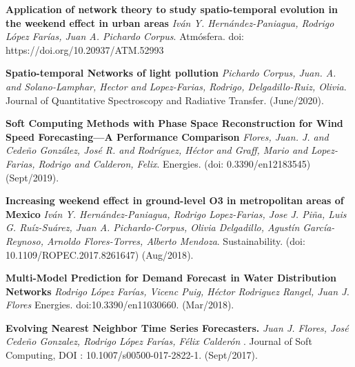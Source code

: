 \documentclass[10pt]{article}
\newenvironment{innerlist}[1][\enskip\textbullet]%
        {\begin{compactitem}[#1]}{\end{compactitem}}
\begin{document}
\begin{innerlist}
\item \textbf{Application of network theory to study spatio-temporal evolution in
the weekend effect in urban areas} \textit{Iván Y. Hernández-Paniagua, Rodrigo López Farías, Juan A. Pichardo Corpus}. Atmósfera. doi: https://doi.org/10.20937/ATM.52993

\item \textbf{Spatio-temporal Networks of light pollution} \textit{{Pichardo Corpus, Juan. A. and Solano-Lamphar, Hector and Lopez-Farias, Rodrigo, Delgadillo-Ruiz, Olivia}}. {Journal of Quantitative Spectroscopy and Radiative Transfer}. ({June/2020}).

\item \textbf{Soft Computing Methods with Phase Space Reconstruction for Wind Speed Forecasting—A Performance Comparison} \textit{{Flores, Juan. J. and Cedeño González, José R. and Rodríguez, Héctor and Graff, Mario and Lopez-Farias, Rodrigo and Calderon, Felix}}. {Energies}. (doi: 0.3390/en12183545) ({Sept/2019}).

\item \textbf{Increasing weekend effect in ground-level O3 in metropolitan areas of Mexico} \textit{Iván Y. Hernández-Paniagua, Rodrigo Lopez-Farias, Jose J. Piña, Luis G. Ruíz-Suárez, Juan A. Pichardo-Corpus, Olivia Delgadillo, Agustín García-Reynoso, Arnoldo Flores-Torres, Alberto Mendoza}. {Sustainability}. (doi: 10.1109/ROPEC.2017.8261647) ({Aug/2018}).

\item \textbf{Multi-Model Prediction for Demand Forecast in
Water Distribution Networks} \textit{Rodrigo López Farías, Vicenc Puig, Héctor Rodriguez Rangel, Juan J. Flores} {Energies}. doi:10.3390/en11030660. ({Mar/2018}).

\item  \textbf{Evolving Nearest Neighbor Time Series Forecasters.} \textit{Juan J. Flores, José Cede\~no Gonzalez, Rodrigo López Farías, Félix Calderón }.  {Journal of Soft Computing},
DOI : 10.1007/s00500-017-2822-1. (Sept/2017).


\end{innerlist}
\end{document}
